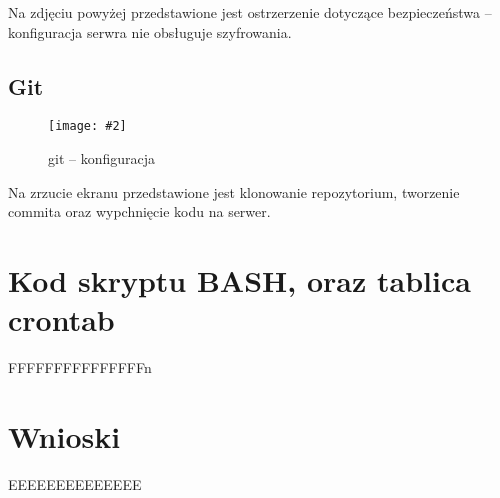 \documentclass[a4paper]{article}
\newcommand*{\zdj}[2][\textwidth]{\texttt{[image: \#2]}}
\newcommand*{\fgc}[5][!htb]{
      \begin{figure*}[#1]
            \phantomsection\label{fig:#5}
            \zdj{#2}
            \caption[#4]{#3}
      \end{figure*}
}
\begin{document}
\newpage
Na zdjęciu powyżej przedstawione jest ostrzerzenie dotyczące bezpieczeństwa – konfiguracja serwra nie obsługuje szyfrowania.  
\subsection{Git}
\fgc{contents/configuration/git/3.png}{git – konfiguracja}{git – konfiguracja}{git-test}
Na zrzucie ekranu przedstawione jest klonowanie repozytorium, tworzenie commita oraz wypchnięcie kodu na serwer.

\newpage
\section{Kod skryptu BASH, oraz tablica crontab}
FFFFFFFFFFFFFFFn
\section{Wnioski}
EEEEEEEEEEEEEE
\newpage
\nocite{k8s-docs}
\nocite{k8s-blog}
\nocite{k8s-github}
\printbibliography[heading=bibnumbered, label=Literatura, title=Literatura]
\end{document}
